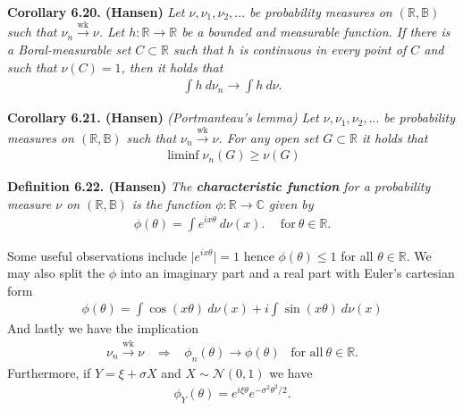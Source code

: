 \documentclass[
]{book}
\begin{document}
\textbf{Corollary 6.20. (Hansen)} \emph{Let \(\nu,\nu_1,\nu_2,...\) be probability measures on \((\mathbb{R},\mathbb{B})\) such that \(\nu_n\stackrel{\text{wk}}{\to}\nu\). Let \(h : \mathbb{R}\to\mathbb{R}\) be a bounded and measurable function. If there is a Boral-measurable set \(C\subset \mathbb{R}\) such that \(h\) is continuous in every point of \(C\) and such that \(\nu(C)=1\), then it holds that}
\begin{align*}
    \int h\ d\nu_n\to \int h\ d\nu.\tag{6.20}
\end{align*}

\textbf{Corollary 6.21. (Hansen)} \emph{(Portmanteau's lemma) Let \(\nu,\nu_1,\nu_2,...\) be probability measures on \((\mathbb{R},\mathbb{B})\) such that \(\nu_n\stackrel{\text{wk}}{\to}\nu\). For any open set \(G\subset \mathbb{R}\) it holds that}
\begin{align*}
    \liminf{\nu_n(G)}\ge \nu(G)\tag{6.21}
\end{align*}

\textbf{Definition 6.22. (Hansen)} \emph{The \textbf{characteristic function} for a probability measure \(\nu\) on \((\mathbb{R},\mathbb{B})\) is the function \(\phi : \mathbb{R}\to \mathbb{C}\) given by}
\begin{align*}
    \phi(\theta)=\int e^{ix\theta}\ d\nu(x).\hspace{15pt}\text{for}\ \theta\in\mathbb{R}.\tag{6.23}
\end{align*}

Some useful observations include \(\vert e^{ix\theta}\vert = 1\) hence \(\phi(\theta)\le 1\) for all \(\theta\in\mathbb{R}\). We may also split the \(\phi\) into an imaginary part and a real part with Euler's cartesian form
\begin{align*}
    \phi(\theta)=\int \cos (x\theta)\ d\nu(x)+i\int \sin (x\theta)\ d\nu(x)\tag{6.24}
\end{align*}
And lastly we have the implication
\begin{align*}
    \nu_n\stackrel{\text{wk}}{\to} \nu \hspace{10pt}\Rightarrow\hspace{10pt} \phi_n(\theta)\to \phi(\theta)\hspace{10pt}\text{for all}\ \theta\in\mathbb{R}.
\end{align*}
Furthermore, if \(Y=\xi+\sigma X\) and \(X\sim \mathcal{N}(0,1)\) we have
\begin{align*}
    \phi_Y(\theta)=e^{i\xi\theta}e^{-\sigma^2\theta^2/2}.
\end{align*}
\end{document}
